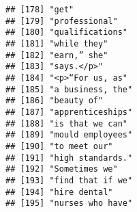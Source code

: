 \documentclass[]{article}
\begin{document}
\begin{verbatim}
## [178] "get"                                                                                                                                      
## [179] "professional"                                                                                                                             
## [180] "qualifications"                                                                                                                           
## [181] "while they"                                                                                                                               
## [182] "earn,” she"                                                                                                                               
## [183] "says.</p>"                                                                                                                                
## [184] "<p>“For us, as"                                                                                                                           
## [185] "a business, the"                                                                                                                          
## [186] "beauty of"                                                                                                                                
## [187] "apprenticeships"                                                                                                                          
## [188] "is that we can"                                                                                                                           
## [189] "mould employees"                                                                                                                          
## [190] "to meet our"                                                                                                                              
## [191] "high standards."                                                                                                                          
## [192] "Sometimes we"                                                                                                                             
## [193] "find that if we"                                                                                                                          
## [194] "hire dental"                                                                                                                              
## [195] "nurses who have"                                                                                                                          

\end{verbatim}
\end{document}

